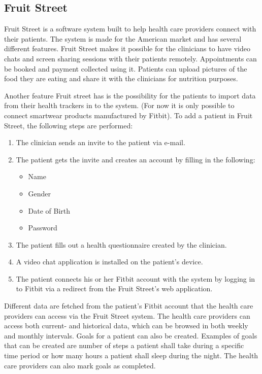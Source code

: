 \documentclass{cslthse-msc}
\begin{document}


\subsection{Fruit Street}

Fruit Street is a software system built to help health care providers connect with their patients. The system is made for the American market and has several different features. Fruit Street makes it possible for the clinicians to have video chats and screen sharing sessions with their patients remotely. Appointments can be booked and payment collected using it. Patients can upload pictures of the food they are eating and share it with the clinicians for nutrition purposes. 

Another feature Fruit street has is the possibility for the patients to import data from their health trackers\cite{FruitStreet} in to the system. (For now it is only possible to connect smartwear products manufactured by Fitbit). To add a patient in Fruit Street, the following steps are performed:

\begin{enumerate}
    \item The clinician sends an invite to the patient via e-mail.
    \item The patient gets the invite and creates an account by filling in the following:
\begin{itemize}
    \item Name
    \item Gender
    \item Date of Birth
    \item Password
\end{itemize}
    \item The patient fills out a health questionnaire created by the clinician.
    \item A video chat application is installed on the patient’s device.
    \item The patient connects his or her Fitbit account with the system by logging in to Fitbit via a redirect from the Fruit Street's web application.
\end{enumerate}

Different data are fetched from the patient's Fitbit account that the health care providers can access via the Fruit Street system. The health care providers can access both current- and historical data, which can be browsed in both weekly and monthly intervals. Goals for a patient can also be created. Examples of goals that can be created are number of steps a patient shall take during a specific time period or how many hours a patient shall sleep during the night. The health care providers can also mark goals as completed. 
\end{document}
